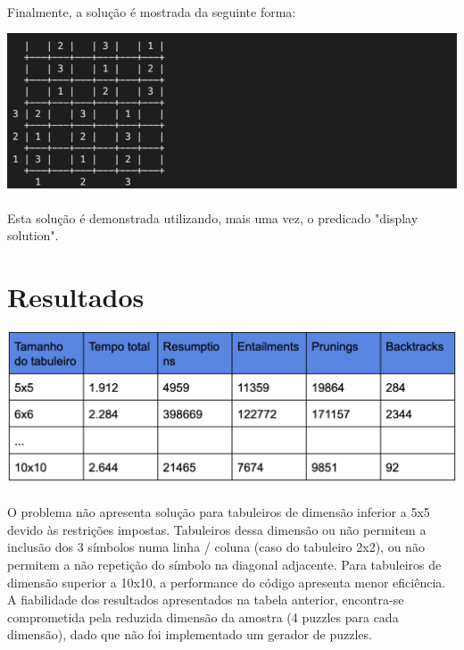 \documentclass[a4paper]{article}
\begin{document}
\paragraph{} 
Finalmente, a solução é mostrada da seguinte forma:

\begin{center}
    \includegraphics[scale=0.4]{img/6.png}
\end{center}

\paragraph{} 
Esta solução é demonstrada utilizando, mais uma vez, o predicado "display solution".

\section{Resultados}

\begin{center}
    \includegraphics[scale=0.4]{img/7.png}
\end{center}

\paragraph{}
O problema não apresenta solução para tabuleiros de dimensão inferior a 5x5 devido às restrições impostas. Tabuleiros dessa dimensão ou não permitem a inclusão dos 3 símbolos numa linha / coluna (caso do tabuleiro 2x2), ou não permitem a não repetição do símbolo na diagonal adjacente.
Para tabuleiros de dimensão superior a 10x10, a performance do código apresenta menor eficiência. 
A fiabilidade dos resultados apresentados na tabela anterior, encontra-se comprometida pela reduzida dimensão da amostra (4 puzzles para cada dimensão), dado que não foi implementado um gerador de puzzles.
\end{document}
